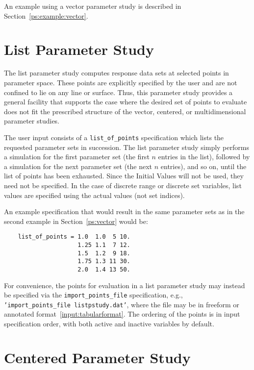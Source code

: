 An example using a vector parameter study is described in 
Section~\ref{ps:example:vector}.

\section{List Parameter Study}\label{ps:list}

The list parameter study computes response data sets at selected
points in parameter space. These points are explicitly specified by
the user and are not confined to lie on any line or surface. Thus,
this parameter study provides a general facility that supports the
case where the desired set of points to evaluate does not fit the
prescribed structure of the vector, centered, or multidimensional
parameter studies.

The user input consists of a \texttt{list\_of\_points} specification
which lists the requested parameter sets in succession. The list
parameter study simply performs a simulation for the first parameter
set (the first $n$ entries in the list), followed by a simulation for
the next parameter set (the next $n$ entries), and so on, until the
list of points has been exhausted. Since the Initial Values will not
be used, they need not be specified.  In the case of discrete range or
discrete set variables, list values are specified using the actual
values (not set indices).

An example specification that would result in the same parameter sets
as in the second example in Section~\ref{ps:vector} would be:
\begin{small}
\begin{verbatim}
    list_of_points = 1.0  1.0  5 10.
                     1.25 1.1  7 12.
                     1.5  1.2  9 18.
                     1.75 1.3 11 30.
                     2.0  1.4 13 50.
\end{verbatim}
\end{small}

For convenience, the points for evaluation in a list parameter study
may instead be specified via the {\tt import\_points\_file}
specification, e.g., {\tt 'import\_points\_file listpstudy.dat'},
where the file  may be in freeform or annotated
format~\ref{input:tabularformat}.  The ordering of the points is in
input specification order, with both active and inactive variables by
default.

\section{Centered Parameter Study}\label{ps:centered}

